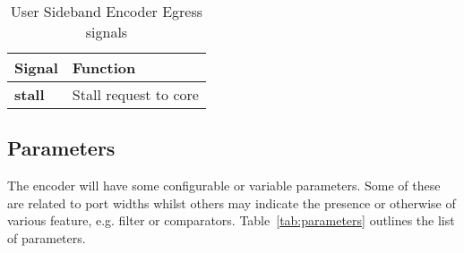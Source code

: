 \begin{table}[htp]
    \centering
    \caption{User Sideband Encoder Egress signals}
    \label{tab:engress-side-band}
    \begin{tabulary}{\textwidth}{|l|l|}
        \hline
        \textbf {Signal} & \textbf {Function} \\
        \hline
        \textbf {stall}& Stall request to core \\
        \hline
    \end{tabulary}
\end{table}


\subsection {Parameters}

The encoder will have some configurable or variable parameters. Some
of these are related to port widths whilst others may indicate the
presence or otherwise of various feature, e.g. filter or comparators.
Table~\ref{tab:parameters} outlines the list of parameters.

